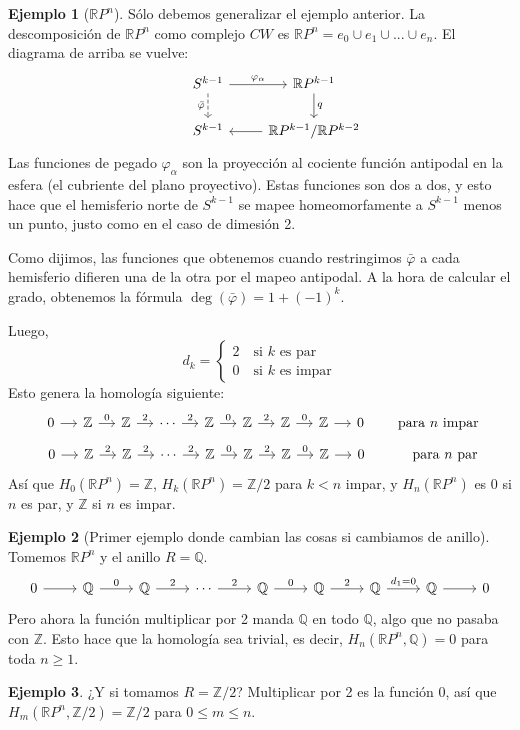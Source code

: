 \documentclass[spanish]{book}
\theoremstyle{definition}
\newtheorem*{ejem}{Ejemplo}
\newcommand{\R}{\mathbb{R}}
\newcommand{\Z}{\mathbb{Z}}
\newcommand{\Q}{\mathbb{Q}}
\begin{document}
	\begin{ejem}[$\R P^n$]
		Sólo debemos generalizar el ejemplo anterior. La descomposición de $\R P^n$ como complejo $CW$ es $\R P^n=e_0\cup e_1\cup...\cup e_n$. El diagrama de arriba se vuelve:
		\[\begin{tikzcd}
			& S^{k-1} \arrow[r, "\varphi_\alpha"] \arrow[d, dashed,swap, "\bar\varphi"] & \mathbb{R}P^{k-1} \arrow[d, "q"] \\
			& S^{k-1} & \mathbb{R}P^{k-1}/\mathbb{R}P^{k-2} \arrow[l]
		\end{tikzcd}\]
		Las funciones de pegado $\varphi_\alpha$ son la proyección al cociente función antipodal en la esfera (el cubriente del plano proyectivo). Estas funciones son dos a dos, y esto hace que el hemisferio norte de $S^{k-1}$ se mapee homeomorfamente a $S^{k-1}$ menos un punto, justo como en el caso de dimesión 2.
		
		Como dijimos, las funciones que obtenemos cuando restringimos $\bar\varphi$ a cada hemisferio difieren una de la otra por el mapeo antipodal. A la hora de calcular el grado, obtenemos la fórmula $\deg (\bar{\varphi})=1+(-1)^k$.
		
		Luego,
		\[d_k=\begin{cases}2\quad\text{si }k\text{ es par}\\0\quad\text{si }k\text{ es impar}\end{cases}\]
		Esto genera la homología siguiente:
		\[\begin{tikzcd}[column sep=small]
			0 \arrow[r] & \mathbb{Z} \arrow[r, "0"] & \mathbb{Z} \arrow[r, "2"] & \cdots \arrow[r, "2"] & \mathbb{Z} \arrow[r, "0"] & \mathbb{Z} \arrow[r, "2"] & \mathbb{Z} \arrow[r, "0"] & \mathbb{Z} \arrow[r] & 0
		\end{tikzcd}\qquad\text{para }n\text{ impar}\]
		\[\begin{tikzcd}[column sep=small]
			0 \arrow[r] & \mathbb{Z} \arrow[r, "2"] & \mathbb{Z} \arrow[r, "2"] & \cdots \arrow[r, "2"] & \mathbb{Z} \arrow[r, "0"] & \mathbb{Z} \arrow[r, "2"] & \mathbb{Z} \arrow[r, "0"] & \mathbb{Z} \arrow[r] & 0
		\end{tikzcd}\qquad\quad\text{para }n\text{ par}
		\]
		Así que $H_0(\R P^n)=\Z$, $H_k(\R P^n)=\Z/2$ para $k<n$ impar,  y $H_n(\R P^n)$ es $0$ si $n$ es par, y $\Z$ si $n$ es impar.
	\end{ejem}
	\begin{ejem}[Primer ejemplo donde cambian las cosas si cambiamos de anillo]
		Tomemos $\R P^n$ y el anillo $R=\Q$.
		\[\begin{tikzcd}
			0 \arrow[r] & \mathbb{Q} \arrow[r, "0"] & \mathbb{Q} \arrow[r, "2"] & \cdots \arrow[r, "2"] & \mathbb{Q} \arrow[r, "0"] & \mathbb{Q} \arrow[r, "2"] & \mathbb{Q} \arrow[r, "d_1=0"] & \mathbb{Q} \arrow[r] & 0
		\end{tikzcd}\]
		Pero ahora la función multiplicar por 2 manda $\Q$ en todo $\Q$, algo que no pasaba con $\Z$. Esto hace que la homología sea trivial, es decir, $H_n(\R P^n,\Q)=0$ para toda $n\geq1$.
	\end{ejem}
	\begin{ejem}
		¿Y si tomamos $R=\Z/2$? Multiplicar por 2 es la función 0, así que $H_m(\R P^n,\Z/2)=\Z/2$ para $0\leq m\leq n$.
	\end{ejem}
\end{document}
